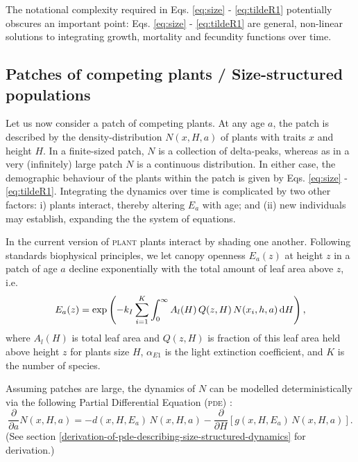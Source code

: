 \documentclass[10pt,twoside]{article}
\newcommand{\plant}{\textsc{plant}}
\begin{document}
The notational complexity required in Eqs. \ref{eq:size} -
\ref{eq:tildeR1} potentially obscures an important point: Eqs.
\ref{eq:size} - \ref{eq:tildeR1} are general, non-linear solutions to
integrating growth, mortality and fecundity functions over time.

\subsection{Patches of competing plants / Size-structured
populations}\label{patches-of-competing-plants-size-structured-populations}

Let us now consider a patch of competing plants. At any age \(a\), the
patch is described by the density-distribution \(N(x, H, a)\) of plants
with traits \(x\) and height \(H\). In a finite-sized patch, \(N\) is a
collection of delta-peaks, whereas as in a very (infinitely) large patch
\(N\) is a continuous distribution. In either case, the demographic
behaviour of the plants within the patch is given by Eqs. \ref{eq:size}
- \ref{eq:tildeR1}. Integrating the dynamics over time is complicated by
two other factors: i) plants interact, thereby altering \(E_a\) with
age; and (ii) new individuals may establish, expanding the the system of
equations.

In the current version of {\plant} plants interact by shading one another.
Following standards biophysical principles, we let canopy openness
\(E_a(z)\) at height \(z\) in a patch of age \(a\) decline exponentially
with the total amount of leaf area above \(z\), i.e.
\begin{equation} \label{eq:light}
  E_a(z) = \exp \left(-k_I  \sum_{i = 1}^{K} \int_{0}^{\infty} A_l(H) \, Q(z, H) \, N(x_i, h, a) \, {\rm d}H \right),
\end{equation}
where \(A_l(H)\) is total leaf area and \(Q(z, H)\) is fraction of
this leaf area held above height \(z\) for plants size \(H\),
\(\alpha_{E1}\) is the light extinction coefficient, and \(K\) is the number
of species.

Assuming patches are large, the dynamics of \(N\) can be modelled
deterministically via the following Partial Differential Equation (\textsc{pde})
\citep{Kohyama-1993, Deroos-1997, Moorcroft-2001}:
\begin{equation} \label{eq:PDE}
  \frac{\partial}{\partial a} N(x, H, a) = - d(x, H, E_a) \, N(x, H, a) - \frac{\partial}{\partial H} \left[g(x, H, E_a) \, N(x, H, a)\right].
\end{equation}
(See section \ref{derivation-of-pde-describing-size-structured-dynamics} for derivation.)
\end{document}
